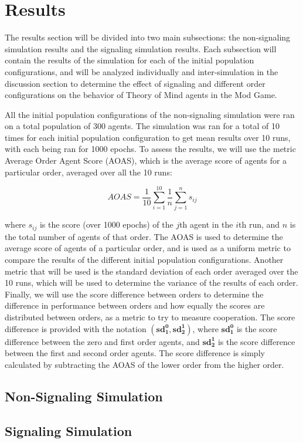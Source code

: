 \section{Results}\label{sec:results}

The results section will be divided into two main subsections: the non-signaling simulation results and the signaling simulation results. Each subsection will contain the results of the simulation for each of the initial population configurations, and will be analyzed individually and inter-simulation in the discussion section to determine the effect of signaling and different order configurations on the behavior of Theory of Mind agents in the Mod Game.

All the initial population configurations of the non-signaling simulation were ran on a total population of 300 agents. The simulation was ran for a total of 10 times for each initial population configuration to get mean results over 10 runs, with each being ran for 1000 epochs. To assess the results, we will use the metric Average Order Agent Score (AOAS), which is the average score of agents for a particular order, averaged over all the 10 runs: 

\begin{equation}
AOAS = \frac{1}{10} \sum_{i=1}^{10} \frac{1}{n} \sum_{j=1}^{n} s_{ij}
\label{eq:aoas}
\end{equation}

where $s_{ij}$ is the score (over 1000 epochs) of the $j$th agent in the $i$th run, and $n$ is the total number of agents of that order. The AOAS is used to determine the average score of agents of a particular order, and is used as a uniform metric to compare the results of the different initial population configurations. Another metric that will be used is the standard deviation of each order averaged over the 10 runs, which will be used to determine the variance of the results of each order. Finally, we will use the score difference between orders to determine the difference in performance between orders and how equally the scores are distributed between orders, as a metric to try to measure cooperation. The score difference is provided with the notation $(\mathbf{sd^0_1}, \mathbf{sd^1_2})$, where $\mathbf{sd^0_1}$ is the score difference between the zero and first order agents, and $\mathbf{sd^1_2}$ is the score difference between the first and second order agents. The score difference is simply calculated by subtracting the AOAS of the lower order from the higher order. 

\subsection{Non-Signaling Simulation}



\subsection{Signaling Simulation}


